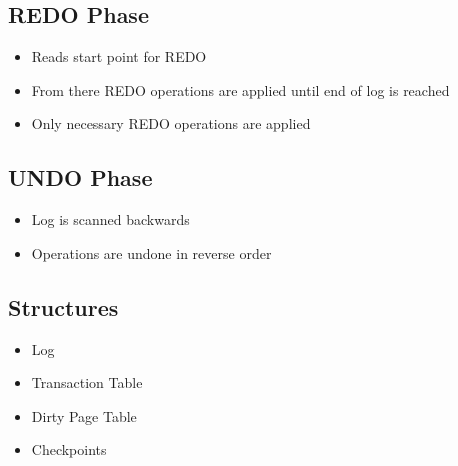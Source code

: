 \subsection{REDO Phase}
\begin{itemize}
	\item Reads start point for REDO
	\item From there REDO operations are applied until end of log is reached
	\item Only necessary REDO operations are applied
\end{itemize}

\subsection{UNDO Phase}
\begin{itemize}
	\item Log is scanned backwards
	\item Operations are undone in reverse order
\end{itemize}

\subsection{Structures}
\begin{itemize}
	\item Log
	\item Transaction Table
	\item Dirty Page Table
	\item Checkpoints
\end{itemize}

